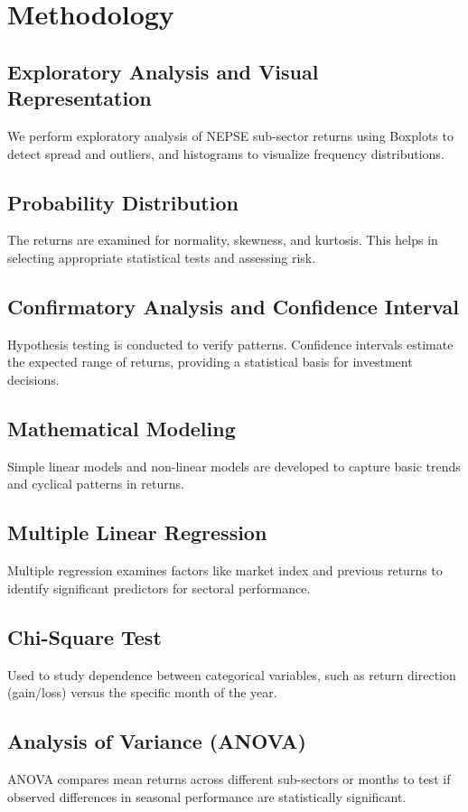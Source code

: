 \documentclass[12pt,a4paper,fleqn]{article}
\begin{document}
\section{Methodology}

\subsection{Exploratory Analysis and Visual Representation}
We perform exploratory analysis of NEPSE sub-sector returns using Boxplots to detect spread and outliers, and histograms to visualize frequency distributions.

\subsection{Probability Distribution}
The returns are examined for normality, skewness, and kurtosis. This helps in selecting appropriate statistical tests and assessing risk.

\subsection{Confirmatory Analysis and Confidence Interval}
Hypothesis testing is conducted to verify patterns. Confidence intervals estimate the expected range of returns, providing a statistical basis for investment decisions.

\subsection{Mathematical Modeling}
Simple linear models and non-linear models are developed to capture basic trends and cyclical patterns in returns.

\subsection{Multiple Linear Regression}
Multiple regression examines factors like market index and previous returns to identify significant predictors for sectoral performance.

\subsection{Chi-Square Test}
Used to study dependence between categorical variables, such as return direction (gain/loss) versus the specific month of the year.

\subsection{Analysis of Variance (ANOVA)}
ANOVA compares mean returns across different sub-sectors or months to test if observed differences in seasonal performance are statistically significant.
\end{document}
